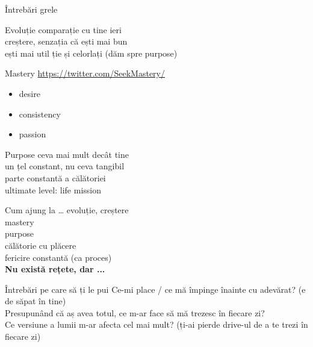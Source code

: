 \documentclass{simple}
\begin{document}
\begin{frame}{Întrebări grele}
  \vspace{1cm}
\end{frame}

\begin{frame}{Evoluție}
  \centering
  \pause
  comparație cu tine ieri \\
  \pause
  creștere, senzația că ești mai bun \\
  \pause
  ești mai util ție și celorlați (dăm spre purpose)
\end{frame}

\begin{frame}{Mastery}
  \url{https://twitter.com/SeekMastery/}
  \begin{itemize}
    \item desire
    \item consistency
    \item passion
  \end{itemize}
\end{frame}

\begin{frame}{Purpose}
  \centering
  \pause
  ceva mai mult decât tine \\
  \pause
  un țel constant, nu ceva tangibil \\
  \pause
  parte constantă a călătoriei \\
  \pause
  ultimate level: life mission
\end{frame}

\begin{frame}{Cum ajung la \ldots}
  \centering
  \pause
  evoluție, creștere \\
  \pause
  mastery \\
  \pause
  purpose \\
  \pause
  călătorie cu plăcere \\
  \pause
  fericire constantă (ca proces) \\
  \pause
  {\large\textbf{Nu există rețete, dar ...}}
\end{frame}

\begin{frame}{Întrebări pe care să ți le pui}
  \centering
  \large
  \pause
  Ce-mi place / ce mă împinge înainte cu adevărat? (e de săpat în tine) \\
  \vspace{1cm}
  \pause
  Presupunând că aș avea totul, ce m-ar face să mă trezesc în fiecare zi? \\
  \vspace{1cm}
  \pause
  Ce versiune a lumii m-ar afecta cel mai mult? (ți-ai pierde drive-ul de a te trezi în fiecare zi) \\
\end{frame}
\end{document}

